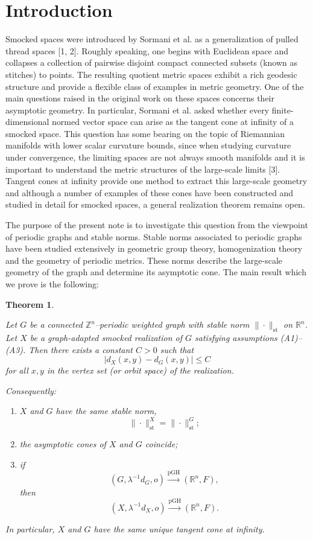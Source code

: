 \documentclass[12pt, letterpaper]{article}
\newtheorem{theorem}{Theorem}
\begin{document}
\section{Introduction}
\label{}

\noindent
Smocked spaces were introduced by Sormani et al. as a generalization of pulled thread spaces [1, 2]. Roughly speaking, one begins with Euclidean space and collapses a collection of pairwise disjoint compact connected subsets (known as stitches) to points. The resulting quotient metric spaces exhibit a rich geodesic structure and provide a flexible class of examples in metric geometry.  One of the main questions raised in the original work on these spaces concerns their asymptotic geometry. In particular, Sormani et al. asked whether every finite-dimensional normed vector space can arise as the tangent cone at infinity of a smocked space.  This question has some bearing on the topic of Riemannian manifolds with lower scalar curvature bounds, since when studying curvature under convergence, the limiting spaces are not always smooth manifolds and it is important to understand the metric structures of the large-scale limits [3].  Tangent cones at infinity provide one method to extract this large-scale geometry and although a number of examples of these cones have been constructed and studied in detail for smocked spaces, a general realization theorem remains open.  




The purpose of the present note is to investigate this question from the viewpoint of periodic graphs and stable norms. Stable norms associated to periodic graphs have been studied extensively in geometric group theory, homogenization theory and the geometry of periodic metrics. These norms describe the large-scale geometry of the graph and determine its asymptotic cone.  The main result which we prove is the following:

\begin{theorem}
\label{thm:main}

Let $G$ be a connected $\mathbb Z^n$--periodic weighted graph with stable norm $\|\cdot\|_{\mathrm{st}}$ on $\mathbb R^n$.  Let $X$ be a graph-adapted smocked realization of $G$
satisfying assumptions {\rm (A1)--(A3)}.  Then there exists a constant $C>0$ such that
\[
|d_X(x,y)-d_G(x,y)|\le C
\]
for all $x,y$ in the vertex set (or orbit space) of the realization.

Consequently:

\begin{enumerate}
\item $X$ and $G$ have the same stable norm,
\[
\|\cdot\|_{\mathrm{st}}^X
=
\|\cdot\|_{\mathrm{st}}^G;
\]

\item the asymptotic cones of $X$ and $G$ coincide;

\item if
\[
(G,\lambda^{-1}d_G,o)
\xrightarrow{\mathrm{pGH}}
(\mathbb R^n,F),
\]
then
\[
(X,\lambda^{-1}d_X,o)
\xrightarrow{\mathrm{pGH}}
(\mathbb R^n,F).
\]
\end{enumerate}

In particular, $X$ and $G$ have the same unique tangent cone at
infinity.
\end{theorem}
\end{document}
